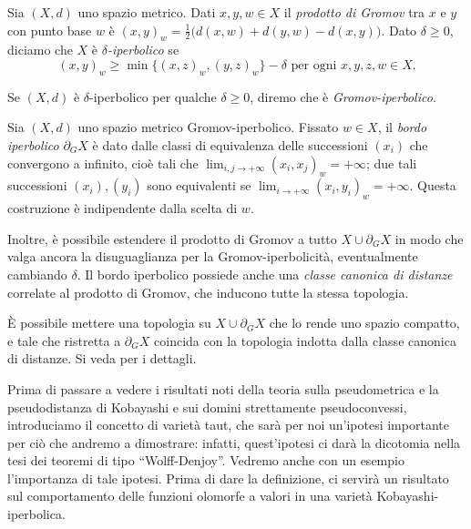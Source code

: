 \begin{defn}
    Sia $(X,d)$ uno spazio metrico. Dati $x,y,w \in X$ il \textit{prodotto di Gromov} tra $x$ e $y$ con punto base $w$ è $(x,y)_w=\frac{1}{2}\big(d(x,w)+d(y,w)-d(x,y)\big)$. Dato $\delta \ge 0$, diciamo che $X$ è \textit{$\delta$-iperbolico} se
    $$(x,y)_w \ge \min\{(x,z)_w,(y,z)_w\}-\delta\text{ per ogni }x,y,z,w \in X.$$

    Se $(X,d)$ è $\delta$-iperbolico per qualche $\delta \ge 0$, diremo che è \textit{Gromov-iperbolico}.
\end{defn}

\begin{defn}
    Sia $(X,d)$ uno spazio metrico Gromov-iperbolico. Fissato $w \in X$, il \textit{bordo iperbolico} $\partial_GX$ è dato dalle classi di equivalenza delle successioni $(x_i)$ che convergono a infinito, cioè tali che $\displaystyle\lim_{i,j\rightarrow+\infty}(x_i,x_j)_w=+\infty$; due tali successioni $(x_i), (y_i)$ sono equivalenti se $\displaystyle\lim_{i\rightarrow+\infty}(x_i,y_i)_w=+\infty$. Questa costruzione è indipendente dalla scelta di $w$.

    Inoltre, è possibile estendere il prodotto di Gromov a tutto $X\cup\partial_GX$ in modo che valga ancora la disuguaglianza per la Gromov-iperbolicità, eventualmente cambiando $\delta$. Il bordo iperbolico possiede anche una \textit{classe canonica di distanze} correlate al prodotto di Gromov, che inducono tutte la stessa topologia.
\end{defn}

\begin{oss}
    È possibile mettere una topologia su $X\cup\partial_GX$ che lo rende uno spazio compatto, e tale che ristretta a $\partial_GX$ coincida con la topologia indotta dalla classe canonica di distanze. Si veda \cite[Part III, Chapter H, Paragraph 3]{BH} per i dettagli.
\end{oss}

Prima di passare a vedere i risultati noti della teoria sulla pseudometrica e la pseudodistanza di Kobayashi e sui domini strettamente pseudoconvessi, introduciamo il concetto di varietà taut, che sarà per noi un'ipotesi importante per ciò che andremo a dimostrare: infatti, quest'ipotesi ci darà la dicotomia nella tesi dei teoremi di tipo ``Wolff-Denjoy''. Vedremo anche con un esempio l'importanza di tale ipotesi. Prima di dare la definizione, ci servirà un risultato sul comportamento delle funzioni olomorfe a valori in una varietà Kobayashi-iperbolica.

